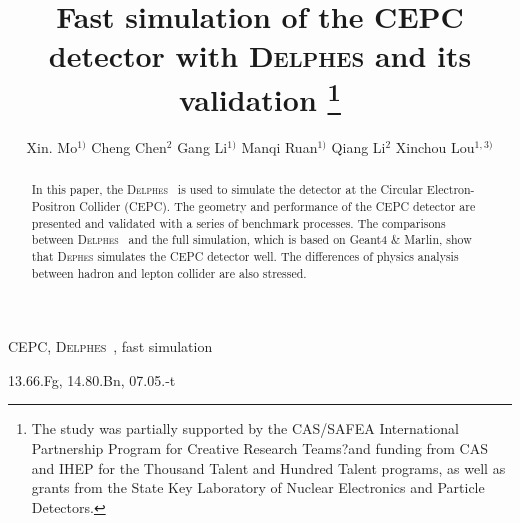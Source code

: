 \documentclass[a4paper,10pt,twoside]{cpc-hepnp}
\begin{document}



\title{Fast simulation of the CEPC detector with {\textsc{Delphes}} and its validation
\thanks{The study was partially supported by the CAS/SAFEA International Partnership Program for Creative Research Teams?and funding from CAS and IHEP for the Thousand Talent and Hundred Talent programs, as well as grants from the State Key Laboratory of Nuclear Electronics and Particle Detectors.}}

\author{%
      Xin. Mo$^{1)}$%
\quad Cheng Chen$^{2}$
\quad Gang Li$^{1)}$%
\quad Manqi Ruan$^{1)}$%
\quad Qiang Li$^{2}$
\quad Xinchou Lou$^{1,3)}$%
}
\maketitle


\address{%
$^1$ Institute of High Energy Physics, Chinese Academy of Sciences, Beijing 100049, China\\
$^2$ Peking University, Beijing, China\\ 
$^3$ University of Texas at Dallas, Richardson, TX 75080-3021, USA
}


\begin{abstract}
In this paper, the {\textsc{Delphes}~} is used to simulate the detector at the Circular Electron-Positron Collider (CEPC).
The geometry and performance of the CEPC detector are presented and validated with a series of benchmark processes.
The comparisons between {\textsc{Delphes}~} and the full simulation, which is based on Geant4 \& Marlin,
show that {\textsc{Dephes}} simulates the CEPC detector well.
The differences of physics analysis between hadron and lepton collider are also stressed.  
\end{abstract}


\begin{keyword}
CEPC, {\textsc{Delphes}~}, fast simulation
\end{keyword}

\begin{pacs}
13.66.Fg, 14.80.Bn, 07.05.-t
\end{pacs}

%
\end{document}
